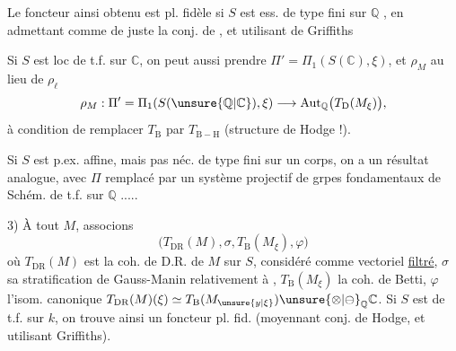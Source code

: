 Le foncteur ainsi obtenu est pl. fidèle si $S$ est ess. de type fini sur $\mathbb Q$ , en admettant comme de juste la conj. de , et utilisant  de Griffiths

Si $S$ est loc de t.f. sur $\mathbb C$, on peut aussi prendre $\Pi'=\Pi_1(S(\mathbb C),\xi)$, et $\rho_M$ au lieu de $\rho_\ell$
\[
\rho_M:\Pi'=\Pi_1(S(\unsure{\mathbb Q|\mathbb C}),\xi)\longrightarrow\operatorname{Aut}_{\mathbb Q}\bigl(T_{\mathrm D}(M_\xi)\bigr),
\]
à condition de remplacer $T_{\mathrm B}$ par $T_{\mathrm{B-H}}$ (structure de Hodge !).

Si $S$ est p.ex. affine,  mais pas néc. de type fini sur un corps, on a un résultat analogue, avec $\Pi$ remplacé par un système projectif de grpes fondamentaux de Schém. de t.f. sur $\mathbb Q$ .....

3) À tout $M$, associons
\[
\bigl(T_{\mathrm{DR}}(M),\sigma,T_{\mathrm B}(M_\xi),\varphi\bigr)
\]
où $T_{\mathrm{DR}}(M)$ est la coh. de D.R. de $M$ sur $S$, considéré comme vectoriel \uline{filtré}, $\sigma$ sa stratification de Gauss-Manin relativement à , $T_{\mathrm B}(M_\xi)$ la coh. de Betti,
$\varphi$ l'isom. canonique $T_{\mathrm{DR}}(M)(\xi)\simeq T_{\mathrm B}(M_{\unsure{y|\xi}})\unsure{\otimes|\ominus}_{\mathbb Q}\mathbb C$. Si $S$ est de t.f. sur $k$, on trouve ainsi un foncteur pl. fid. (moyennant conj. de Hodge, et utilisant Griffiths).




